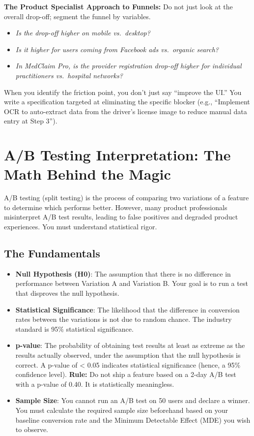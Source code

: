 \documentclass[
  11pt,
  openany,
  oneside]{book}
\providecommand{\tightlist}{%
  \setlength{\itemsep}{0pt}\setlength{\parskip}{0pt}}
\begin{document}
\textbf{The Product Specialist Approach to Funnels:} Do not just look at
the overall drop-off; segment the funnel by variables.

\begin{itemize}
\tightlist
\item
  \emph{Is the drop-off higher on mobile vs.~desktop?}
\item
  \emph{Is it higher for users coming from Facebook ads vs.~organic
  search?}
\item
  \emph{In MedClaim Pro, is the provider registration drop-off higher
  for individual practitioners vs.~hospital networks?}
\end{itemize}

When you identify the friction point, you don't just say ``improve the
UI.'' You write a specification targeted at eliminating the specific
blocker (e.g., ``Implement OCR to auto-extract data from the driver's
license image to reduce manual data entry at Step 3'').

\bigskip

\section{A/B Testing Interpretation: The Math Behind the
Magic}\label{ab-testing-interpretation-the-math-behind-the-magic}

A/B testing (split testing) is the process of comparing two variations
of a feature to determine which performs better. However, many product
professionals misinterpret A/B test results, leading to false positives
and degraded product experiences. You must understand statistical rigor.

\subsection{The Fundamentals}\label{the-fundamentals}

\begin{itemize}
\tightlist
\item
  \textbf{Null Hypothesis (H0)}: The assumption that there is no
  difference in performance between Variation A and Variation B. Your
  goal is to run a test that disproves the null hypothesis.
\item
  \textbf{Statistical Significance}: The likelihood that the difference
  in conversion rates between the variations is not due to random
  chance. The industry standard is 95\% statistical significance.
\item
  \textbf{p-value}: The probability of obtaining test results at least
  as extreme as the results actually observed, under the assumption that
  the null hypothesis is correct. A p-value of \textless{} 0.05
  indicates statistical significance (hence, a 95\% confidence level).
  \textbf{Rule:} Do not ship a feature based on a 2-day A/B test with a
  p-value of 0.40. It is statistically meaningless.
\item
  \textbf{Sample Size}: You cannot run an A/B test on 50 users and
  declare a winner. You must calculate the required sample size
  beforehand based on your baseline conversion rate and the Minimum
  Detectable Effect (MDE) you wish to observe.
\end{itemize}
\end{document}
